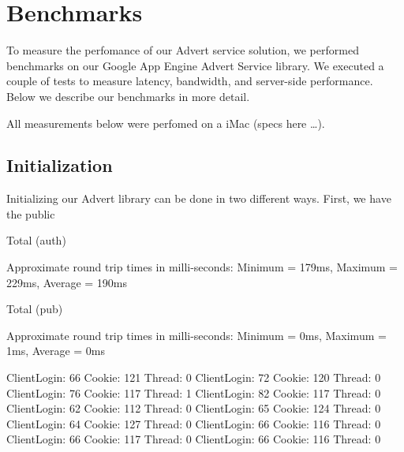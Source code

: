 \section{Benchmarks}
To measure the perfomance of our Advert service solution, we performed
benchmarks on our Google App Engine Advert Service library. We executed a
couple of tests to measure latency, bandwidth, and server-side performance.
Below we describe our benchmarks in more detail.

All measurements below were perfomed on a iMac (specs here \ldots). 

\subsection{Initialization}
Initializing our Advert library can be done in two different ways. First, we
have the public

Total (auth)

Approximate round trip times in milli-seconds:
	Minimum = 179ms, Maximum = 229ms, Average = 190ms
	
Total (pub)

Approximate round trip times in milli-seconds:
	Minimum = 0ms, Maximum = 1ms, Average = 0ms
	
ClientLogin: 66
Cookie: 121
Thread: 0
ClientLogin: 72
Cookie: 120
Thread: 0
ClientLogin: 76
Cookie: 117
Thread: 1
ClientLogin: 82
Cookie: 117
Thread: 0
ClientLogin: 62
Cookie: 112
Thread: 0
ClientLogin: 65
Cookie: 124
Thread: 0
ClientLogin: 64
Cookie: 127
Thread: 0
ClientLogin: 66
Cookie: 116
Thread: 0
ClientLogin: 66
Cookie: 117
Thread: 0
ClientLogin: 66
Cookie: 116
Thread: 0
